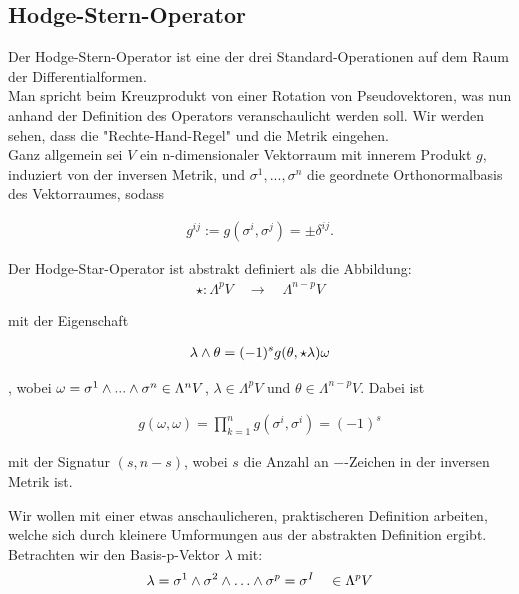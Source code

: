 \subsection{Hodge-Stern-Operator}
Der Hodge-Stern-Operator ist eine der drei Standard-Operationen auf dem Raum der Differentialformen. \\
Man spricht beim Kreuzprodukt von einer Rotation von Pseudovektoren, was nun anhand der Definition des Operators veranschaulicht werden soll. Wir werden sehen, dass die "Rechte-Hand-Regel" und die Metrik eingehen. \\
Ganz allgemein sei $V$ ein n-dimensionaler Vektorraum mit innerem Produkt $g$, induziert von der inversen Metrik, und ${\sigma^1, ..., \sigma^n}$ die geordnete Orthonormalbasis des Vektorraumes, sodass

\begin{align*}
g^{i j} := g(\sigma^{i},\sigma^{j}) = \pm \delta^{i j}.
\end{align*}


Der Hodge-Star-Operator ist abstrakt definiert als die Abbildung:
\begin{align*}
\star : \Lambda^p V \quad \rightarrow \quad  \Lambda^{n-p} V 
\end{align*}

mit der Eigenschaft

\begin{align}
\lambda \wedge \theta = (-1)^s g(\theta,\star\lambda) \omega
\end{align}

, wobei $\omega = \sigma^1 \wedge ... \wedge \sigma^n \in \Lambda^n V$, $\lambda \in \Lambda^p V$ und $\theta \in \Lambda^{n-p} V$. Dabei ist

 \begin{align}
 g(\omega,\omega) = \prod_{k=1}^{n} g(\sigma^{i},\sigma^{i}) = (-1)^s
 \end{align}
 
mit der Signatur $(s,n-s)$, wobei $s$ die Anzahl an $-$-Zeichen in der inversen Metrik ist.

 
Wir wollen mit einer etwas anschaulicheren, praktischeren Definition arbeiten, welche sich durch kleinere Umformungen aus der abstrakten Definition ergibt. \\

 Betrachten wir den Basis-p-Vektor $\lambda$ mit:
 \begin{align}
 \lambda = \sigma^1 \w \sigma^2 \w \dots \w \sigma^p = \sigma^{I} \quad \in \Lambda^p V
 \end{align}
 
